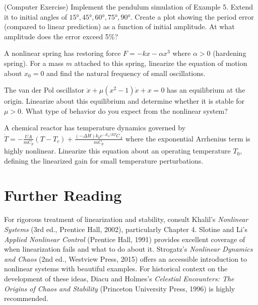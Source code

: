 \begin{exercise}
(Computer Exercise) Implement the pendulum simulation of Example 5. Extend it to initial angles of $15°, 45°, 60°, 75°, 90°$. Create a plot showing the period error (compared to linear prediction) as a function of initial amplitude. At what amplitude does the error exceed 5\%?
\end{exercise}

\begin{exercise}
A nonlinear spring has restoring force $F = -kx - \alpha x^3$ where $\alpha > 0$ (hardening spring). For a mass $m$ attached to this spring, linearize the equation of motion about $x_0 = 0$ and find the natural frequency of small oscillations.
\end{exercise}

\begin{exercise}
The van der Pol oscillator $\ddot{x} + \mu(x^2 - 1)\dot{x} + x = 0$ has an equilibrium at the origin. Linearize about this equilibrium and determine whether it is stable for $\mu > 0$. What type of behavior do you expect from the nonlinear system?
\end{exercise}

\begin{exercise}
A chemical reactor has temperature dynamics governed by $\dot{T} = -\frac{UA}{mC_p}(T - T_c) + \frac{(-\Delta H)k_0 e^{-E_a/RT}C_A}{mC_p}$ where the exponential Arrhenius term is highly nonlinear. Linearize this equation about an operating temperature $T_0$, defining the linearized gain for small temperature perturbations.
\end{exercise}

\section{Further Reading}

For rigorous treatment of linearization and stability, consult Khalil's \textit{Nonlinear Systems} (3rd ed., Prentice Hall, 2002), particularly Chapter 4. Slotine and Li's \textit{Applied Nonlinear Control} (Prentice Hall, 1991) provides excellent coverage of when linearization fails and what to do about it. Strogatz's \textit{Nonlinear Dynamics and Chaos} (2nd ed., Westview Press, 2015) offers an accessible introduction to nonlinear systems with beautiful examples. For historical context on the development of these ideas, Diacu and Holmes's \textit{Celestial Encounters: The Origins of Chaos and Stability} (Princeton University Press, 1996) is highly recommended.

